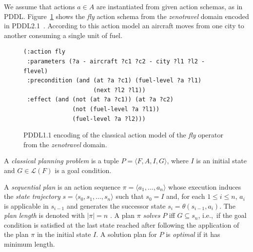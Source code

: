 \documentclass[letterpaper]{article} %
\newcommand{\tup}[1]{{\langle #1 \rangle}}
\begin{document}
We assume that actions $a\in A$ are instantiated from given action schemas, as in PDDL. Figure~\ref{fig:flyc} shows the {\em fly} action schema from the {\em zenotravel} domain encoded in PDDL2.1~\cite{fox2003pddl2}. According to this action model an aircraft moves from one city to another consuming a single unit of fuel.

\begin{figure}[hbt!]
	\begin{scriptsize}
		\begin{verbatim}
(:action fly 
 :parameters (?a - aircraft ?c1 ?c2 - city ?l1 ?l2 - flevel)
 :precondition (and (at ?a ?c1) (fuel-level ?a ?l1)
                    (next ?l2 ?l1))
 :effect (and (not (at ?a ?c1)) (at ?a ?c2)
              (not (fuel-level ?a ?l1))
              (fuel-level ?a ?l2)))
		\end{verbatim}
	\end{scriptsize}
	\caption{PDDL1.1 encoding of the classical action model of the {\em fly} operator from the {\em zenotravel} domain.}
	\label{fig:flyc}
\end{figure}


A {\em classical planning problem} is a tuple $P=\tup{F,A,I,G}$, where $I$ is an initial state and $G\in\mathcal{L}(F)$ is a goal condition.

A {\em sequential plan} is an action sequence $\pi=\tup{a_1, \ldots, a_n}$ whose execution induces the {\em state trajectory} $s=\tup{s_0, s_1, \ldots, s_n}$ such that $s_0=I$ and, for each {\small $1\leq i\leq n$}, $a_i$ is applicable in $s_{i-1}$ and generates the successor state $s_i=\theta(s_{i-1},a_i)$. The {\em plan length} is denoted with $|\pi|=n$ . A plan $\pi$ {\em solves} $P$ iff $G\subseteq s_n$, i.e.,~if the goal condition is satisfied at the last state reached after following the application of the plan $\pi$ in the initial state $I$. A solution plan for $P$ is {\em optimal} if it has minimum length.
\end{document}

